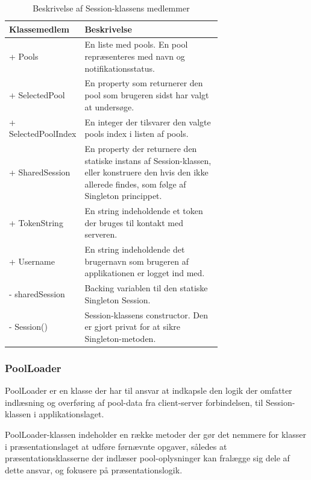 \begin{table}
	\centering
	\begin{tabular}{| l | p{0.7\linewidth} |}
		\toprule
		\textbf{Klassemedlem}	& \textbf{Beskrivelse} \\
		\midrule
		+ Pools		& En liste med pools. En pool repræsenteres med navn og notifikationsstatus.		\\\hline
		+ SelectedPool			& En property som returnerer den pool som brugeren sidst har valgt at undersøge.	\\\hline
		+ SelectedPoolIndex				& En integer der tilsvarer den valgte pools index i listen af pools.				\\\hline
		+ SharedSession				& En property der returnere den statiske instans af Session-klassen, eller konstruere den hvis den ikke allerede findes, som følge af Singleton princippet. \\\hline
		+ TokenString					& En string indeholdende et token der bruges til kontakt med serveren. \\\hline
		+ Username						& En string indeholdende det brugernavn som brugeren af applikationen er logget ind med. \\\hline
		- sharedSession					& Backing variablen til den statiske Singleton Session. \\\hline
		- Session()							& Session-klassens constructor. Den er gjort privat for at sikre Singleton-metoden. \\
		\bottomrule
		\end{tabular}
	\caption{Beskrivelse af Session-klassens medlemmer}
	\label{tab:table_design_session}	
\end{table}

\subsubsection{PoolLoader}
PoolLoader er en klasse der har til ansvar at indkapsle den logik der omfatter indlæsning og overføring af pool-data fra client-server forbindelsen, til Session-klassen i applikationslaget. 

PoolLoader-klassen indeholder en række metoder der gør det nemmere for klasser i præsentationslaget at udføre førnævnte opgaver, således at præsentationsklasserne der indlæser pool-oplysninger kan fralægge sig dele af dette ansvar, og fokusere på præsentationslogik.

